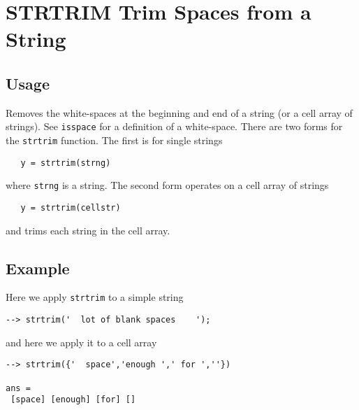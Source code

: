 \section{STRTRIM Trim Spaces from a String}

\subsection{Usage}

Removes the white-spaces at the beginning and end of a string (or a 
cell array of strings). See \verb|isspace| for a definition of a white-space.
There are two forms for the \verb|strtrim| function.  The first is for
single strings
\begin{verbatim}
   y = strtrim(strng)
\end{verbatim}
where \verb|strng| is a string.  The second form operates on a cell array
of strings
\begin{verbatim}
   y = strtrim(cellstr)
\end{verbatim}
and trims each string in the cell array.
\subsection{Example}

Here we apply \verb|strtrim| to a simple string
\begin{verbatim}
--> strtrim('  lot of blank spaces    ');
\end{verbatim}
and here we apply it to a cell array
\begin{verbatim}
--> strtrim({'  space','enough ',' for ',''})

ans = 
 [space] [enough] [for] [] 
\end{verbatim}
